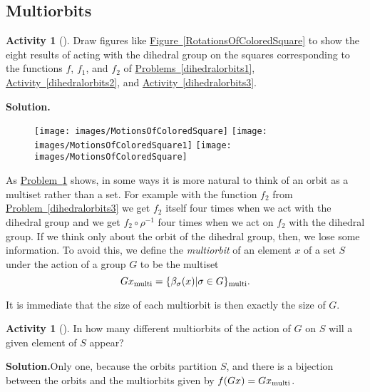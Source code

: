 \documentclass[10pt,]{book}
\theoremstyle{plain}
\theoremstyle{definition}
\newtheorem{activity}[project]{Activity}
\numberwithin{equation}{chapter}
\begin{document}
\subsection[{Multiorbits}]{Multiorbits}\label{subsection-65}
\begin{activity}[]\label{multiorbits1}
Draw figures like \hyperref[RotationsOfColoredSquare]{Figure~\ref{RotationsOfColoredSquare}} to show the eight results of acting with the dihedral group on the squares corresponding to the functions \(f\), \(f_1\), and \(f_2\) of \hyperref[dihedralorbits1]{Problems~\ref{dihedralorbits1}}, \hyperref[dihedralorbits2]{Activity~\ref{dihedralorbits2}}, and \hyperref[dihedralorbits3]{Activity~\ref{dihedralorbits3}}.%
\par\medskip\noindent%
\textbf{Solution.}\quad \leavevmode%
\begin{figure}
\centering
\texttt{[image: images/MotionsOfColoredSquare]}
\texttt{[image: images/MotionsOfColoredSquare1]}
\texttt{[image: images/MotionsOfColoredSquare]}
\end{figure}
\end{activity}
As \hyperref[multiorbits1]{Problem~\ref{multiorbits1}} shows, in some ways it is more natural to think of an orbit as a multiset rather than a set. For example with the function \(f_2\) from \hyperref[dihedralorbits3]{Problem~\ref{dihedralorbits3}} we get \(f_2\) itself four times when we act with the dihedral group and we get \(f_2\circ\rho^{-1}\) four times when we act on \(f_2\) with the dihedral group. If we think only about the orbit of the dihedral group, then, we lose some information. To avoid this, we define the \emph{multiorbit} of an element \(x\) of a set \(S\) under the action of a group \(G\) to be the multiset%
\begin{equation*}
Gx_{\mbox{\scriptsize multi} } = \{\beta_{\sigma}(x)|\sigma \in
G\}_{\mbox{\scriptsize multi} }.
\end{equation*}
%
\par
It is immediate that the size of each multiorbit is then exactly the size of \(G\).%
\begin{activity}[]\label{NumberContainingx}
In how many different multiorbits of the action of \(G\) on \(S\) will a given element of \(S\) appear?%
\par\medskip\noindent%
\textbf{Solution.}\quad Only one, because the orbits partition \(S\), and there is a bijection between the orbits and the multiorbits given by \(f(Gx) =
Gx_{\mbox{\scriptsize multi} }\).%
\end{activity}
\end{document}
